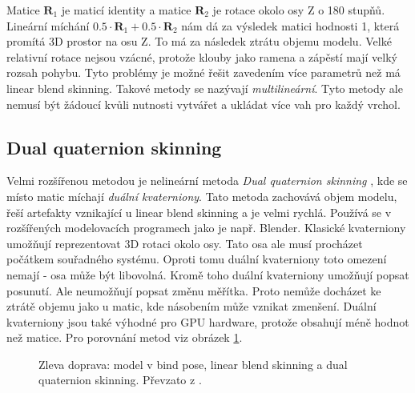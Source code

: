 Matice $\mathbf{R}_1$ je maticí identity a matice $\mathbf{R}_2$ je rotace okolo osy Z o 180 stupňů. Lineární míchání $0.5 \cdot \mathbf{R}_1 + 0.5 \cdot \mathbf{R}_2$ nám dá za výsledek matici hodnosti 1, která promítá 3D prostor na osu Z. To má za následek ztrátu objemu modelu. Velké relativní rotace nejsou vzácné, protože klouby jako ramena a zápěstí mají velký rozsah pohybu. Tyto problémy je možné řešit zavedením více parametrů než má linear blend skinning. Takové metody se nazývají \textit{multilineární}. Tyto metody ale nemusí být žádoucí kvůli nutnosti vytvářet a ukládat více vah pro každý vrchol.

\subsection{Dual quaternion skinning}
Velmi rozšířenou metodou je nelineární metoda \textit{Dual quaternion skinning} \cite{dualQuat}, kde se místo matic míchají \textit{duální kvaterniony}. Tato metoda zachovává objem modelu, řeší artefakty vznikající u linear blend skinning a je velmi rychlá. Používá se v rozšířených modelovacích programech jako je např. Blender. Klasické kvaterniony umožňují reprezentovat 3D rotaci okolo osy. Tato osa ale musí procházet počátkem souřadného systému. Oproti tomu duální kvaterniony toto omezení nemají - osa může být libovolná. Kromě toho duální kvaterniony umožňují popsat posunutí. Ale neumožňují popsat změnu měřítka. Proto nemůže docházet ke ztrátě objemu jako u matic, kde násobením může vznikat zmenšení. Duální kvater\-niony jsou také výhodné pro GPU hardware, protože obsahují méně hodnot než matice. Pro porovnání metod viz obrázek \ref{skinning_methods}.

\begin{figure}[h]
\begin{center}
\caption{Zleva doprava: model v bind pose, linear blend skinning a dual quaternion skinning. Převzato z \cite{skinningMethods}.} \label{skinning_methods}
\end{center}
\end{figure}

